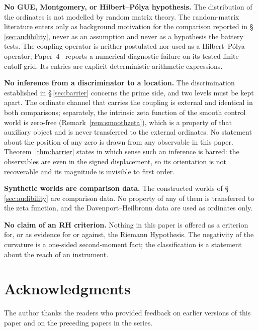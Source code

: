 \documentclass[11pt]{article}
\begin{document}
\textbf{No GUE, Montgomery, or Hilbert--P\'olya hypothesis.}
The distribution of the ordinates is not modelled by random matrix theory.
The random-matrix literature enters only as background motivation for the
comparison reported in \S\,\ref{sec:audibility}, never as an assumption and
never as a hypothesis the battery tests. The coupling operator is neither postulated nor used as a
Hilbert--P\'olya operator; Paper~4~\cite{Paper4} reports a numerical
diagnostic failure on its tested finite-cutoff grid. Its entries are
explicit deterministic arithmetic expressions.

\textbf{No inference from a discriminator to a location.}
The discrimination established in \S\,\ref{sec:barrier} concerns the prime
side, and two levels must be kept apart. The ordinate channel that carries the
coupling is external and identical in both comparisons; separately, the
intrinsic zeta function of the smooth control world is zero-free
(Remark~\ref{rem:smoothzeta}), which is a property of that auxiliary object
and is never transferred to the external ordinates. No statement about the
position of any zero is drawn from any observable in this paper. Theorem~\ref{thm:barrier} states in which sense such
an inference is barred: the observables are even in the signed displacement, so
its orientation is not recoverable and its magnitude is invisible to first
order.

\textbf{Synthetic worlds are comparison data.}
The constructed worlds of \S\,\ref{sec:audibility} are comparison data. No
property of any of them is transferred to the zeta function, and the
Davenport--Heilbronn data are used as ordinates only.

\textbf{No claim of an RH criterion.}
Nothing in this paper is offered as a criterion for, or as evidence for or
against, the Riemann Hypothesis. The negativity of the curvature is a
one-sided second-moment fact; the classification is a statement about the
reach of an instrument.

\section*{Acknowledgments}

The author thanks the readers who provided feedback on earlier versions of
this paper and on the preceding papers in the series.

\end{document}
